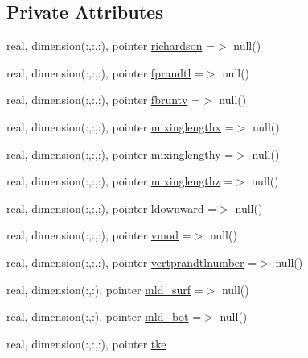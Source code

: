 \subsection*{Private Attributes}
\begin{DoxyCompactItemize}
\item 
real, dimension(\+:,\+:,\+:), pointer \mbox{\hyperlink{structmoduleturbulence_1_1t__turbvar_a0e0f9cdd976f40342b36523bcfea463a}{richardson}} =$>$ null()
\item 
real, dimension(\+:,\+:,\+:), pointer \mbox{\hyperlink{structmoduleturbulence_1_1t__turbvar_a484649173a0f662b5e5e07f83208b156}{fprandtl}} =$>$ null()
\item 
real, dimension(\+:,\+:,\+:), pointer \mbox{\hyperlink{structmoduleturbulence_1_1t__turbvar_a5f4f271d1a29636caa6227033036bed2}{fbruntv}} =$>$ null()
\item 
real, dimension(\+:,\+:,\+:), pointer \mbox{\hyperlink{structmoduleturbulence_1_1t__turbvar_a8eea81605e12f9ea4b77a7dffdb062dc}{mixinglengthx}} =$>$ null()
\item 
real, dimension(\+:,\+:,\+:), pointer \mbox{\hyperlink{structmoduleturbulence_1_1t__turbvar_aa3901e886df9fdc39ad8f0c1e2cea6d4}{mixinglengthy}} =$>$ null()
\item 
real, dimension(\+:,\+:,\+:), pointer \mbox{\hyperlink{structmoduleturbulence_1_1t__turbvar_a21ebbc9352fd0be841d3af7c9b552a55}{mixinglengthz}} =$>$ null()
\item 
real, dimension(\+:,\+:,\+:), pointer \mbox{\hyperlink{structmoduleturbulence_1_1t__turbvar_aefea81af4b11e3fad0c924de84dd935c}{ldownward}} =$>$ null()
\item 
real, dimension(\+:,\+:,\+:), pointer \mbox{\hyperlink{structmoduleturbulence_1_1t__turbvar_a5b916600c942a8152d8ada08a06d77c4}{vmod}} =$>$ null()
\item 
real, dimension(\+:,\+:,\+:), pointer \mbox{\hyperlink{structmoduleturbulence_1_1t__turbvar_ac1e120827d980afc69478670c4d48f36}{vertprandtlnumber}} =$>$ null()
\item 
real, dimension(\+:,\+:), pointer \mbox{\hyperlink{structmoduleturbulence_1_1t__turbvar_accecabc2a6047ea72f77db571ae9148e}{mld\+\_\+surf}} =$>$ null()
\item 
real, dimension(\+:,\+:), pointer \mbox{\hyperlink{structmoduleturbulence_1_1t__turbvar_a60455d04f167988cd1811f2d2f76504f}{mld\+\_\+bot}} =$>$ null()
\item 
real, dimension(\+:,\+:,\+:), pointer \mbox{\hyperlink{structmoduleturbulence_1_1t__turbvar_a3eb219ad5e9bcfd53a0c6bce7f0ebc82}{tke}}

\end{DoxyCompactItemize}
